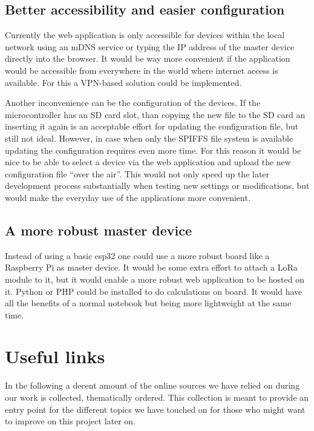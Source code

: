 \documentclass[11pt,a4paper]{article}
\begin{document}
\subsection{Better accessibility and easier configuration}

Currently the web application is only accessible for devices within the local network using an mDNS service or typing the IP address of the master device directly into the browser.
It would be way more convenient if the application would be accessible from everywhere in the world where internet access is available. For this a VPN-based solution could be implemented.

Another inconvenience can be the configuration of the devices. If the microcontroller has an SD card slot, than copying the new file to the SD card an inserting it again is an acceptable effort for updating the configuration file, but still not ideal. However, in case when only the SPIFFS file system is available updating the configuration requires even more time. For this reason it would be nice to be able to select a device via the web application and upload the new configuration file ``over the air''.
This would not only speed up the later development process substantially when testing new settings or modifications, but would make the everyday use of the applications more convenient. 

\subsection{A more robust master device}

Instead of using a basic esp32 one could use a more robust board like a Raspberry Pi as master device. It would be some extra effort to attach a LoRa module to it, but it would enable a more robust web application to be hosted on it. Python or PHP could be installed to do calculations on board. It would have all the benefits of a normal notebook but being more lightweight at the same time.


\section{Useful links}

In the following a decent amount of the online sources we have relied on during our work is collected, thematically ordered. This collection is meant to provide an entry point for the different topics we have touched on for those who might want to improve on this project later on.
\end{document}
